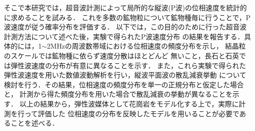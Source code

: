 そこで本研究では，超音波計測によって局所的な縦波(P波)の位相速度を統計的に求めることを試みる．
これを多数の鉱物粒について鉱物種毎に行うことで，P波速度が従う確率分布を評価する．
以下では，この目的のために行った超音波計測方法について述べた後，実験で得られたP波速度分布
の結果を報告する．具体的には，1$\sim$2MHzの周波数帯域における位相速度の頻度分布を示し，
結晶粒のスケールでは鉱物種に依らず速度分散はほとどんど
無いこと，長石と石英では弾性波速度の分布が有意に異なることを示す．
また，これら実験で得られた弾性波速度を用いた数値波動解析を行い，縦波平面波の散乱減衰挙動
について検討を行う．その結果，位相速度の頻度分布を単一の正規分布と仮定した場合と，
計測から得た頻度分布を用いた場合で散乱減衰の挙動が異なることを示す．
以上の結果から，弾性波媒体として花崗岩をモデル化する上で，実際に計測を行って評価した
位相速度の分布を反映したモデルを用いることが必要であることを述べる．

